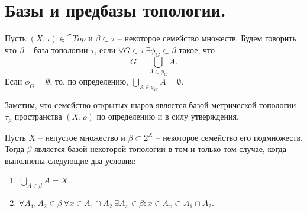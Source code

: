 \section{Базы и предбазы топологии.}
\begin{definition}
    Пусть $(X, \tau) \in \cat{Top}$ и $\beta \subset \tau$ -- некоторое семейство множеств.
    Будем говорить что $\beta$ -- база топологии $\tau$, если $\forall G \in \tau \ \exists \phi_G \subset \beta$ такое, что
    \[
        G = \bigcup_{A \in \phi_G} A.
    \]
    Если $\phi_G = \emptyset$, то, по определению, $\bigcup_{A \in \phi_G} A = \emptyset$.
\end{definition}
\begin{example}
    Заметим, что семейство открытых шаров является базой метрической топологии $\tau_\rho$ пространства $(X, \rho)$ по определению и в силу утверждения.
\end{example}
\begin{proposition}
    Пусть $X$ -- непустое множество и $\beta\subset 2^X$ -- некоторое семейство его подмножеств.
    Тогда $\beta$ является базой некоторой топологии в том и только том случае, когда выполнены следующие два условия:
    \begin{enumerate}
        \item $\bigcup_{A \in \beta} A = X$.
        \item $\forall A_1, A_2 \in \beta \ \forall x \in A_1 \cap A_2 \ \exists A_x \in \beta\colon  x \in A_x \subset A_1 \cap A_2$.
    \end{enumerate}
\end{proposition}
